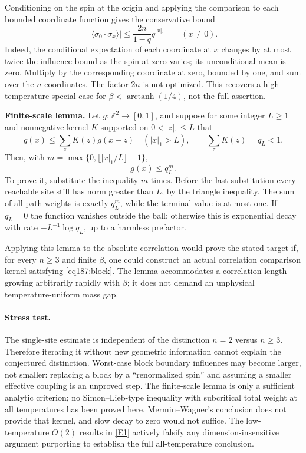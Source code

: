 \documentclass[11pt,a4paper]{article}
\newcommand{\Z}{\mathbb{Z}}
\newcommand{\eref}[2]{\hyperlink{extra:#1:#2}{[E#2]}}
\numberwithin{equation}{section}
\begin{document}
Conditioning on the spin at the origin and applying the comparison to each bounded coordinate function gives the conservative bound
\begin{equation}\label{eq187:highT}
 |\langle\sigma_0\cdot\sigma_x\rangle|
 \le \frac{2n}{1-q}q^{|x|_1}\qquad(x\ne0).
\end{equation}
Indeed, the conditional expectation of each coordinate at $x$ changes by at most twice the influence bound as the spin at zero varies; its unconditional mean is zero. Multiply by the corresponding coordinate at zero, bounded by one, and sum over the $n$ coordinates. The factor $2n$ is not optimized. This recovers a high-temperature special case for $\beta<\operatorname{arctanh}(1/4)$, not the full assertion.

\textbf{Finite-scale lemma.} Let $g:\Z^2\to[0,1]$, and suppose for some integer $L\ge1$ and nonnegative kernel $K$ supported on $0<|z|_1\le L$ that
\begin{equation}\label{eq187:block}
 g(x)\le\sum_zK(z)g(x-z)\quad(|x|_1>L),\qquad
 \sum_zK(z)=q_L<1.
\end{equation}
Then, with $m=\max\{0,\lfloor |x|_1/L\rfloor-1\}$,
\[
 g(x)\le q_L^m.
\]
To prove it, substitute the inequality $m$ times. Before the last substitution every reachable site still has norm greater than $L$, by the triangle inequality. The sum of all path weights is exactly $q_L^m$, while the terminal value is at most one. If $q_L=0$ the function vanishes outside the ball; otherwise this is exponential decay with rate $-L^{-1}\log q_L$, up to a harmless prefactor.

Applying this lemma to the absolute correlation would prove the stated target if, for every $n\ge3$ and finite $\beta$, one could construct an actual correlation comparison kernel satisfying \eqref{eq187:block}. The lemma accommodates a correlation length growing arbitrarily rapidly with $\beta$; it does not demand an unphysical temperature-uniform mass gap.

\paragraph{Stress test.}
The single-site estimate is independent of the distinction $n=2$ versus $n\ge3$. Therefore iterating it without new geometric information cannot explain the conjectured distinction. Worst-case block boundary influences may become larger, not smaller: replacing a block by a ``renormalized spin'' and assuming a smaller effective coupling is an unproved step. The finite-scale lemma is only a sufficient analytic criterion; no Simon--Lieb-type inequality with subcritical total weight at all temperatures has been proved here. Mermin--Wagner's conclusion does not provide that kernel, and slow decay to zero would not suffice. The low-temperature $O(2)$ results in \eref{30006780}{1} actively falsify any dimension-insensitive argument purporting to establish the full all-temperature conclusion.
\end{document}
